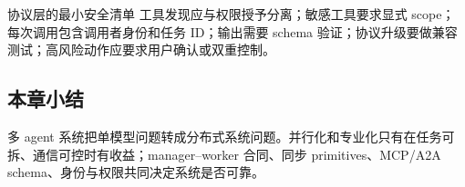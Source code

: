 
\begin{importantbox}{协议层的最小安全清单}
工具发现应与权限授予分离；敏感工具要求显式 scope；每次调用包含调用者身份和任务 ID；输出需要 schema 验证；协议升级要做兼容测试；高风险动作应要求用户确认或双重控制。
\end{importantbox}

\subsection{本章小结}

多 agent 系统把单模型问题转成分布式系统问题。并行化和专业化只有在任务可拆、通信可控时有收益；manager--worker 合同、同步 primitives、MCP/A2A schema、身份与权限共同决定系统是否可靠。

